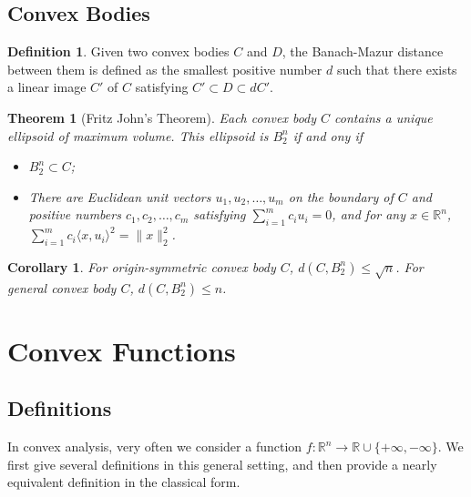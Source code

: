\documentclass[openany]{book}
\newtheorem{corollary}{Corollary}[chapter]
\newtheorem{theorem}{Theorem}[chapter]
\theoremstyle{definition}
\newtheorem{definition}{Definition}[chapter]
\theoremstyle{remark}
\begin{document}
\section{Convex Bodies}
\begin{definition}
    Given two convex bodies $C$ and $D$, the Banach-Mazur distance between them is defined as the smallest positive number $d$ such that there exists a linear image $C'$ of $C$ satisfying $C'\subset D\subset dC'$.
\end{definition}
\begin{theorem}[Fritz John's Theorem]
    Each convex body $C$ contains a unique ellipsoid of maximum volume. This ellipsoid is $B_2^n$ if and ony if
    \begin{itemize}
        \item $B_2^n\subset C$;
        \item There are Euclidean unit vectors $u_1,u_2,\ldots,u_m$ on the boundary of $C$ and positive numbers $c_1,c_2,\ldots,c_m$ satisfying $\sum_{i=1}^{m}c_iu_i=0$, and for any $x\in \mathbb{R}^n$, $\sum_{i=1}^{m}c_i \langle x,u_i\rangle^2=\|x\|_2^2$.
    \end{itemize}
\end{theorem}
\begin{corollary}
    For origin-symmetric convex body $C$, $d(C,B_2^n)\le\sqrt{n}$. For general convex body $C$, $d(C,B_2^n)\le n$.
\end{corollary}

\chapter{Convex Functions}
\section{Definitions}
In convex analysis, very often we consider a function $f:\mathbb{R}^n\to \mathbb{R}\cup\{+\infty,-\infty\}$. We first give several definitions in this general setting, and then provide a nearly equivalent definition in the classical form.
\end{document}
